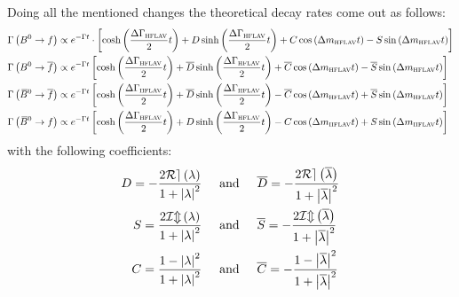 Doing all the mentioned changes the theoretical decay rates come out as follows:
\begin{align}
  \Gamma\left(\Bz\to f\right) &\propto e^{-\Gamma t} \cdot \left[
  \cosh\left(\frac{\DG_{\scaleto{\text{HFLAV}}{4pt}}}{2}t\right)+D\sinh\left(\frac{\DG_{\scaleto{\text{HFLAV}}{4pt}}}{2}t\right)
  +C\cos\left(\dm_{\scaleto{\text{HFLAV}}{4pt}} t\right)-S\sin\left(\dm_{\scaleto{\text{HFLAV}}{4pt}} t\right)\right] \label{eq:theodecrateHFLAV1}\\
  \Gamma\left(\Bz\to \overline{f}\right) &\propto e^{-\Gamma t}
  \left[\cosh\left(\frac{\DG_{\scaleto{\text{HFLAV}}{4pt}}}{2}t\right)+\overline{D}\sinh\left(\frac{\DG_{\scaleto{\text{HFLAV}}{4pt}}}{2}t\right)
  +\overline{C}\cos\left(\dm_{\scaleto{\text{HFLAV}}{4pt}} t\right)
  -\overline{S}\sin\left(\dm_{\scaleto{\text{HFLAV}}{4pt}} t\right)\right]\label{eq:theodecrateHFLAV2}\\
  \Gamma\left(\Bzb\to \overline{f}\right) &\propto e^{-\Gamma t}
  \left[\cosh\left(\frac{\DG_{\scaleto{\text{HFLAV}}{4pt}}}{2}t\right)+\overline{D}\sinh\left(\frac{\DG_{\scaleto{\text{HFLAV}}{4pt}}}{2}t\right)
  -\overline{C}\cos\left(\dm_{\scaleto{\text{HFLAV}}{4pt}} t\right)
  +\overline{S}\sin\left(\dm_{\scaleto{\text{HFLAV}}{4pt}} t\right)\right]\label{eq:theodecrateHFLAV3}\\
  \Gamma\left(\Bzb\to f\right) &\propto e^{-\Gamma t}
  \left[\cosh\left(\frac{\DG_{\scaleto{\text{HFLAV}}{4pt}}}{2}t\right)+D\sinh\left(\frac{\DG_{\scaleto{\text{HFLAV}}{4pt}}}{2}t\right)
  -C\cos\left(\dm_{\scaleto{\text{HFLAV}}{4pt}} t\right)
  +S\sin\left(\dm_{\scaleto{\text{HFLAV}}{4pt}} t\right)\right]\label{eq:theodecrateHFLAV4}
\end{align}
with the following \CP coefficients:
\begin{align}
  D = -\frac{2\mathcal{Re}\left(\lambda\right)}{1+\left|\lambda\right|^2} \hspace{0.5cm} &\text{and} \hspace{0.5cm}
  \overline{D} = -\frac{2\mathcal{Re}\left(\overline{\lambda}\right)}{1+\left|\overline{\lambda}\right|^2}\nonumber\\
  S = \frac{2\mathcal{Im}\left(\lambda\right)}{1+\left|\lambda\right|^2} \hspace{0.5cm} &\text{and} \hspace{0.5cm}
  \overline{S} = -\frac{2\mathcal{Im}\left(\overline{\lambda}\right)}{1+\left|\overline{\lambda}\right|^2}\nonumber\\
  C = \frac{1-\left|\lambda\right|^2}{1+\left|\lambda\right|^2} \hspace{0.5cm} &\text{and} \hspace{0.5cm}
  \overline{C} = -\frac{1-\left|\overline{\lambda}\right|^2}{1+\left|\overline{\lambda}\right|^2}\nonumber
\end{align}
